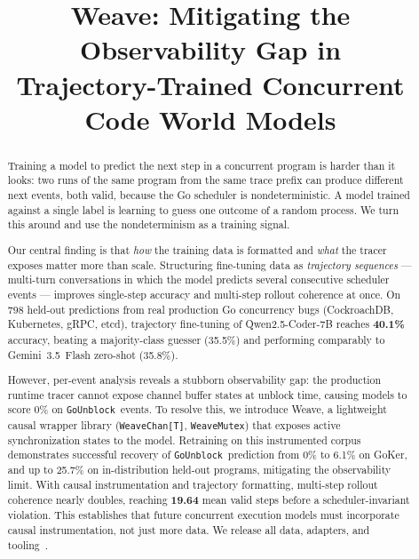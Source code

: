 \documentclass[10pt,conference]{IEEEtran}
\newcommand{\eunblock}{\texttt{GoUnblock}}
\begin{document}
\title{Weave: Mitigating the Observability Gap in\\
Trajectory-Trained Concurrent Code World Models}

\author{}

\maketitle

\begin{abstract}
Training a model to predict the next step in a concurrent program is
harder than it looks: two runs of the same program from the same trace
prefix can produce different next events, both valid, because the Go
scheduler is nondeterministic.
A model trained against a single label is learning to guess one outcome
of a random process. We turn this around and use the nondeterminism as a training signal.

Our central finding is that \emph{how} the training data is formatted
and \emph{what} the tracer exposes matter more than scale.
Structuring fine-tuning data as \emph{trajectory sequences} —
multi-turn conversations in which the model predicts several
consecutive scheduler events — improves single-step accuracy and multi-step rollout coherence at once.
On 798 held-out predictions from real production Go concurrency bugs
(CockroachDB, Kubernetes, gRPC, etcd), trajectory fine-tuning of Qwen2.5-Coder-7B
reaches \textbf{40.1\%} accuracy, beating a majority-class guesser (35.5\%)
and performing comparably to Gemini~3.5~Flash zero-shot (35.8\%).

However, per-event analysis reveals a stubborn observability gap:
the production runtime tracer cannot expose channel buffer states at unblock time,
causing models to score 0\% on \eunblock\ events.
To resolve this, we introduce Weave, a lightweight causal wrapper library
(\texttt{WeaveChan[T]}, \texttt{WeaveMutex}) that exposes active synchronization states to the model.
Retraining on this instrumented corpus demonstrates successful recovery of \eunblock\
prediction from 0\% to 6.1\% on GoKer, and up to 25.7\% on in-distribution held-out programs, mitigating the observability limit.
With causal instrumentation and trajectory formatting, multi-step rollout coherence nearly doubles,
reaching \textbf{19.64} mean valid steps before a scheduler-invariant violation.
This establishes that future concurrent execution models must incorporate causal instrumentation, not just more data.
We release all data, adapters, and tooling~\cite{anon-artifacts}.
\end{abstract}
\end{document}
